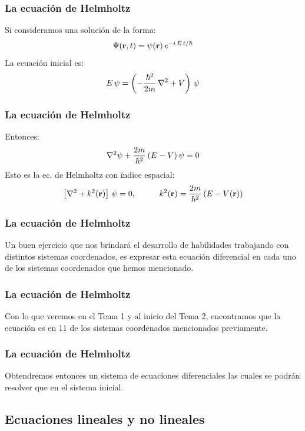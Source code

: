 \documentclass[12pt]{beamer}
\begin{document}
\begin{frame}
\frametitle{La ecuación de Helmholtz}
Si consideramos una solución de la forma:
\begin{align*}
\Psi (\vb{r}, t) = \psi (\vb{r}) \, e^{- i \, E \, t / \hbar} 
\end{align*}
\pause
La ecuación inicial es:
\begin{align*}
E \, \psi = \left( - \dfrac{\hbar^{2}}{2 m} \, \laplacian + V \right) \, \psi
\end{align*}
\end{frame}
\begin{frame}
\frametitle{La ecuación de Helmholtz}
Entonces:
\pause
\begin{align*}
\laplacian \psi + \dfrac{2 m}{\hbar^{2}} \, (E - V) \, \psi = 0
\end{align*}
\pause
Esto es la ec. de Helmholtz con índice espacial:
\begin{align*}
  \left[ \laplacian + k^{2} (\vb{r}) \right] \, \psi = 0, \hspace{1cm} k^{2} (\vb{r}) = \dfrac{2 m}{\hbar^{2}} \, (E - V (\vb{r}))
\end{align*}
\end{frame}
\begin{frame}
\frametitle{La ecuación de Helmholtz}
Un buen ejercicio que nos brindará el desarrollo de habilidades trabajando con distintos sistemas coordenados, es expresar esta ecuación diferencial en cada uno de los sistemas coordenados que hemos mencionado.
\end{frame}
\begin{frame}
\frametitle{La ecuación de Helmholtz}
Con lo que veremos en el Tema 1 y al inicio del Tema 2, encontramos que la ecuación es  en 11 de los sistemas coordenados mencionados previamente.
\end{frame}
\begin{frame}
\frametitle{La ecuación de Helmholtz}
Obtendremos entonces un sistema de ecuaciones diferenciales las cuales se podrán resolver  que en el sistema inicial.
\end{frame}

\subsection{Ecuaciones lineales y no lineales}
\end{document}
